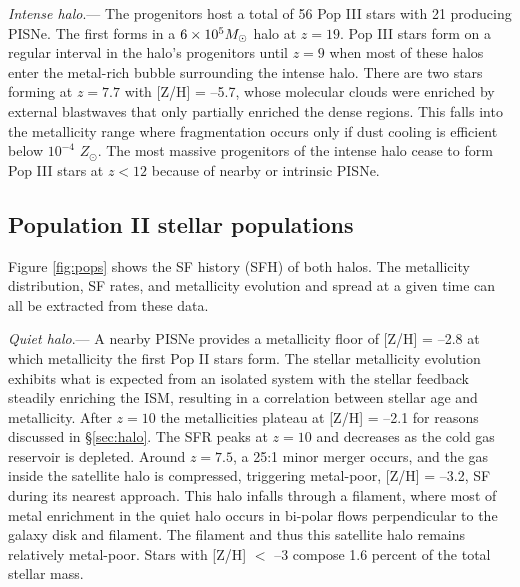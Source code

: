\documentclass[12pt]{article}
\newcommand{\Ms}{\ifmmode{M_\odot}\else{$M_\odot$}\fi}
\newcommand\tento[1]{$10^{#1}$}
\begin{document}
\textit{Intense halo}.--- The progenitors host a total of 56 Pop III
stars with 21 producing PISNe.  The first forms in a $6 \times 10^5
\Ms$ halo at $z=19$.  Pop III stars form on a regular interval in the
halo's progenitors until $z=9$ when most of these halos enter the
metal-rich bubble surrounding the intense halo.  There are two stars
forming at $z=7.7$ with [Z/H] = --5.7, whose molecular clouds were
enriched by external blastwaves that only partially enriched the dense
regions.  This falls into the metallicity range where fragmentation
occurs only if dust cooling is efficient below \tento{-4} $Z_\odot$.
The most massive progenitors of the intense halo cease to form Pop III
stars at $z<12$ because of nearby or intrinsic PISNe.

\subsection*{Population II stellar populations}
\label{sec:pop}



Figure \ref{fig:pops} shows the SF history (SFH) of both halos.  The
metallicity distribution, SF rates, and metallicity evolution and
spread at a given time can all be extracted from these data.

\textit{Quiet halo}.--- A nearby PISNe provides a metallicity floor of
[Z/H] = --2.8 at which metallicity the first Pop II stars form.  The
stellar metallicity evolution exhibits what is expected from an
isolated system with the stellar feedback steadily enriching the ISM,
resulting in a correlation between stellar age and metallicity.  After
$z=10$ the metallicities plateau at [Z/H] = --2.1 for reasons
discussed in \S\ref{sec:halo}.  The SFR peaks at $z=10$ and decreases
as the cold gas reservoir is depleted.  Around $z=7.5$, a 25:1 minor
merger occurs, and the gas inside the satellite halo is compressed,
triggering metal-poor, [Z/H] = --3.2, SF during its nearest approach.
This halo infalls through a filament, where most of metal enrichment
in the quiet halo occurs in bi-polar flows perpendicular to the galaxy
disk and filament.  The filament and thus this satellite halo remains
relatively metal-poor.  Stars with [Z/H] $<$ --3 compose 1.6 percent
of the total stellar mass.
       
\end{document}
